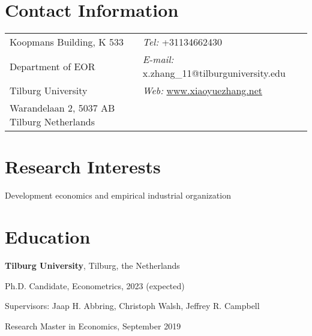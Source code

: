 \documentclass[margin,line]{res}
\newenvironment{list1}{
  \begin{list}{\ding{113}}{%
      \setlength{\itemsep}{0in}
      \setlength{\parsep}{0in} \setlength{\parskip}{0in}
      \setlength{\topsep}{0in} \setlength{\partopsep}{0in} 
      \setlength{\leftmargin}{0.17in}}}{\end{list}}
\newenvironment{list2}{
  \begin{list}{$\bullet$}{%
      \setlength{\itemsep}{0in}
      \setlength{\parsep}{0in} \setlength{\parskip}{0in}
      \setlength{\topsep}{0in} \setlength{\partopsep}{0in} 
      \setlength{\leftmargin}{0.2in}}}{\end{list}}
\begin{document}

\begin{resume}
\section{\sc Contact Information}
\vspace{.05in}
\begin{tabular}{@{}p{2in}p{4in}}
Koopmans Building, K 533     & {\it Tel:}  +31134662430 \\            
Department of EOR   &  {\it E-mail:}  x.zhang\_11@tilburguniversity.edu\\         
Tilburg University &{\it Web:} {\color{black} \url{www.xiaoyuezhang.net}} \\       
Warandelaan 2, 5037 AB Tilburg Netherlands  & \\     
\end{tabular}

\section{\sc Research Interests}
Development economics and empirical industrial organization

\section{\sc Education}
{\bf Tilburg University}, Tilburg, the Netherlands\\
\vspace*{-.1in}
\begin{list1}
\item[] Ph.D. Candidate, Econometrics, 2023 (expected) 
\vspace*{.05in}
\item[] Supervisors:  Jaap H. Abbring, Christoph Walsh, Jeffrey R. Campbell
%
%
\vspace*{.05in}
\item[] Research Master in Economics,  September 2019
\end{list1}


\end{resume}
\end{document}
